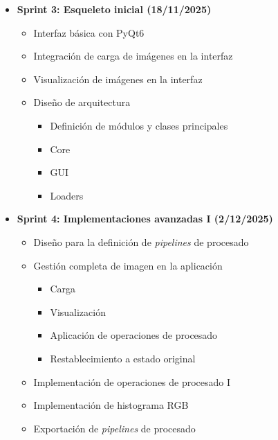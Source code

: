 \documentclass{article}
\begin{document}
\begin{itemize}
\begin{itemize}
    \end{itemize}
    \item \textbf{Sprint 3: Esqueleto inicial (18/11/2025)}
    \begin{itemize}
        \item Interfaz básica con PyQt6
        \item Integración de carga de imágenes en la interfaz
        \item Visualización de imágenes en la interfaz
        \item Diseño de arquitectura
        \begin{itemize}
            \item Definición de módulos y clases principales
            \item Core
            \item GUI
            \item Loaders
        \end{itemize}
    \end{itemize}
\end{itemize}

\newpage 

\begin{itemize}
    \item \textbf{Sprint 4: Implementaciones avanzadas I (2/12/2025)}
    \begin{itemize}
        \item Diseño para la definición de \textit{pipelines} de procesado
        \item Gestión completa de imagen en la aplicación
        \begin{itemize}
            \item Carga
            \item Visualización
            \item Aplicación de operaciones de procesado
            \item Restablecimiento a estado original
        \end{itemize}
        \item Implementación de operaciones de procesado I
        \item Implementación de histograma RGB
        \item Exportación de \textit{pipelines} de procesado
    \end{itemize}
\end{itemize}
\end{document}
